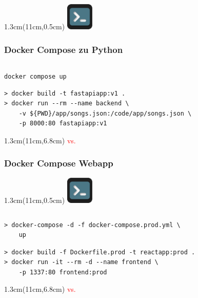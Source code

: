 \documentclass[22pt]{beamer}
\newcommand{\terminal}{
    \begin{textblock*}{1.3cm}(11cm,0.5cm) %
    \includegraphics[width=1.3cm]{Bilder/terminal2.png}
    \end{textblock*}
}
\begin{document}
\begin{frame}[fragile]
    \terminal
    \frametitle{Docker Compose zu Python}
    \inputminted[fontsize=\footnotesize, frame=lines]{dockerfile}{../examples/FastAPI/docker-compose.yml}
    \verb|docker compose up|
    \medskip\pause
    \begin{verbatim}
> docker build -t fastapiapp:v1 .
> docker run --rm --name backend \
    -v ${PWD}/app/songs.json:/code/app/songs.json \
    -p 8000:80 fastapiapp:v1
    \end{verbatim}
    \begin{textblock*}{1.3cm}(11cm,6.8cm) %
        \huge \textcolor{red}{vs.}
    \end{textblock*}
\end{frame}

\begin{frame}[fragile]
    \frametitle{Docker Compose Webapp}
    \terminal
    \inputminted[fontsize=\footnotesize, frame=lines]{dockerfile}{../examples/React/docker-compose.prod.yml}
\begin{verbatim}
> docker-compose -d -f docker-compose.prod.yml \
    up
\end{verbatim}
\medskip

\begin{verbatim}
> docker build -f Dockerfile.prod -t reactapp:prod .
> docker run -it --rm -d --name frontend \
    -p 1337:80 frontend:prod
\end{verbatim}
\only<1>{
    \begin{textblock*}{6cm}(1cm,1.5cm) %
        \begin{tcolorbox}[width=6cm, height=4.2cm, colback=white, colframe=white, sharp corners]
        \centering
        \end{tcolorbox}
    \end{textblock*}
}
\only<2>{}
\begin{textblock*}{1.3cm}(11cm,6.8cm) %
    \huge \textcolor{red}{vs.}
\end{textblock*}
\end{frame}
\end{document}
